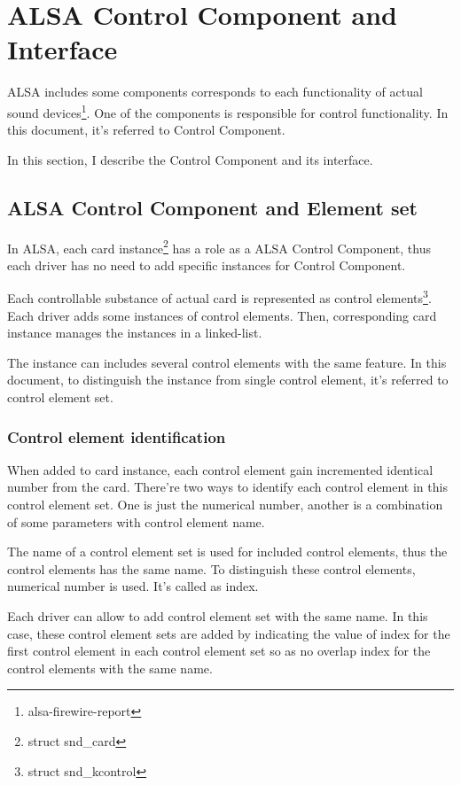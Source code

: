 \documentclass[onecolumn]{article}
\begin{document}
\section{ALSA Control Component and Interface}

ALSA includes some components corresponds to each functionality of actual sound devices\footnote{alsa-firewire-report}. One of the components is responsible for control functionality. In this document, it's referred to Control Component.

In this section, I describe the Control Component and its interface.


\subsection{ALSA Control Component and Element set}

In ALSA, each card instance\footnote{struct snd\_card} has a role as a ALSA Control Component, thus each driver has no need to add specific instances for Control Component.

Each controllable substance of actual card is represented as control elements\footnote{struct snd\_kcontrol}. Each driver adds some instances of control elements. Then, corresponding card instance manages the instances in a linked-list.

The instance can includes several control elements with the same feature. In this document, to distinguish the instance from single control element, it's referred to control element set.


\subsubsection{Control element identification}

When added to card instance, each control element gain incremented identical number from the card. There're two ways to identify each control element in this control element set. One is just the numerical number, another is a combination of some parameters with control element name.

The name of a control element set is used for included control elements, thus the control elements has the same name. To distinguish these control elements, numerical number is used. It's called as index.

Each driver can allow to add control element set with the same name. In this case, these control element sets are added by indicating the value of index for the first control element in each control element set so as no overlap index for the control elements with the same name.
\end{document}
